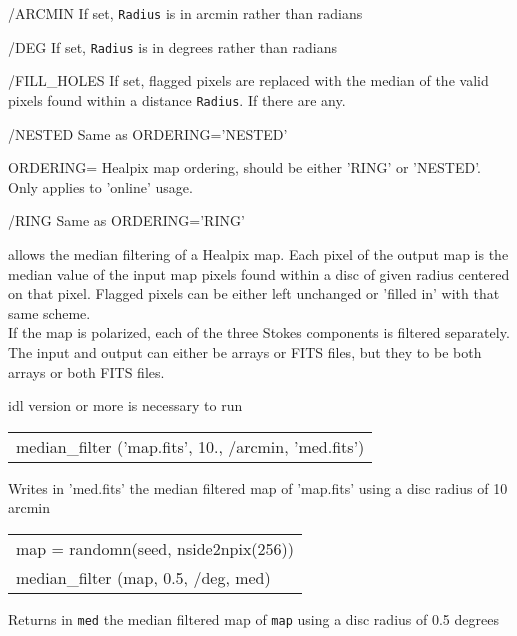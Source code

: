 \begin{keywords}
  \begin{kwlist}{} %
    \item[{/ARCMIN}] If set, {\tt Radius} is in arcmin rather than radians

    \item[{/DEG}] If set, {\tt Radius} is in degrees rather than radians

	\item[{/FILL\_HOLES}] If set, flagged pixels are replaced with the
	median of the valid pixels found within a distance {\tt Radius}. If
	there are any.

 	\item[{/NESTED}] Same as ORDERING='NESTED'

 	\item[{ORDERING=}] 
	  Healpix map ordering, should be either 'RING' or 'NESTED'. Only
	  applies to 'online' usage.

 	\item[{/RING}] Same as ORDERING='RING'

   \end{kwlist}
\end{keywords}

\begin{codedescription}
{\facname allows the median filtering of a Healpix map. Each pixel
  of the output map is the median value of the input  map pixels found within a disc of given
  radius centered on that pixel. Flagged
  pixels can be either left unchanged or 'filled in' with that same scheme. \\
If the map is polarized, each of the three Stokes components is filtered
  separately. \\
The input and output can either be arrays or FITS files, but they to be both
  arrays or both FITS files.}
\end{codedescription}



\begin{related}
  \begin{sulist}{} %
  \item[idl] version \idlversion or more is necessary to run \facname
  \end{sulist}
\end{related}


\begin{example}
{
\begin{tabular}{l} %
median\_filter  ('map.fits', 10., /arcmin, 'med.fits') \\
\end{tabular}
}
{Writes in 'med.fits' the median filtered map of 'map.fits' using a disc radius
  of 10 arcmin}
\end{example}


\begin{example}
{
\begin{tabular}{l} %
map =  randomn(seed, nside2npix(256)) \\
median\_filter  (map, 0.5, /deg, med) \\
\end{tabular}
}
{Returns in {\tt med} the median filtered map of {\tt map} using a disc radius
  of 0.5 degrees}
\end{example}


